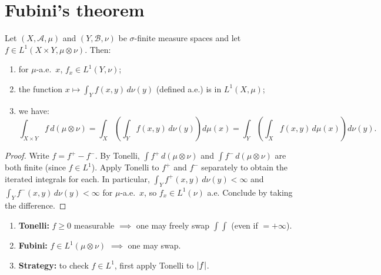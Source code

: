 \section{Fubini's theorem}

\begin{theorem}[Fubini]
\label{thm:fubini}
Let $(X, \mathcal{A}, \mu)$ and $(Y, \mathcal{B}, \nu)$ be $\sigma$-finite measure
spaces and let $f \in L^1(X \times Y, \mu \otimes \nu)$. Then:
\begin{enumerate}
    \item[(i)] for $\mu$-a.e.\ $x$, $f_x \in L^1(Y, \nu)$;
    \item[(ii)] the function $x \mapsto \int_Y f(x,y)\, d\nu(y)$ (defined a.e.)
    is in $L^1(X, \mu)$;
    \item[(iii)] we have:
    \[
        \int_{X \times Y} f\, d(\mu \otimes \nu)
        = \int_X \!\left(\int_Y f(x,y)\, d\nu(y)\right) d\mu(x)
        = \int_Y \!\left(\int_X f(x,y)\, d\mu(x)\right) d\nu(y).
    \]
\end{enumerate}
\end{theorem}

\begin{proof}
Write $f = f^+ - f^-$. By Tonelli, $\int f^+\, d(\mu \otimes \nu)$ and
$\int f^-\, d(\mu \otimes \nu)$ are both finite (since $f \in L^1$). Apply Tonelli
to $f^+$ and $f^-$ separately to obtain the iterated integrals for each. In
particular, $\int_Y f^+(x,y)\, d\nu(y) < \infty$ and
$\int_Y f^-(x,y)\, d\nu(y) < \infty$ for $\mu$-a.e.\ $x$, so
$f_x \in L^1(\nu)$ a.e. Conclude by taking the difference.
\end{proof}

\begin{keyformulas}[title=\textbf{Fubini-Tonelli: user guide}]
\begin{enumerate}
    \item \textbf{Tonelli:} $f \geq 0$ measurable $\implies$ one may freely swap
    $\int\int$ (even if $= +\infty$).
    \item \textbf{Fubini:} $f \in L^1(\mu \otimes \nu)$ $\implies$ one may swap.
    \item \textbf{Strategy:} to check $f \in L^1$, first apply Tonelli to $\left| f \right|$.
\end{enumerate}
\end{keyformulas}

